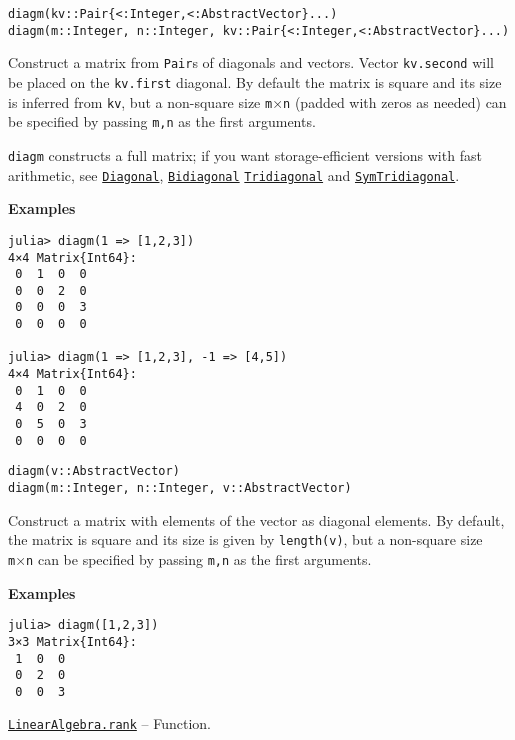 \begin{adjustwidth}{2em}{0pt}


\begin{verbatim}
diagm(kv::Pair{<:Integer,<:AbstractVector}...)
diagm(m::Integer, n::Integer, kv::Pair{<:Integer,<:AbstractVector}...)
\end{verbatim}

Construct a matrix from \texttt{Pair}s of diagonals and vectors. Vector \texttt{kv.second} will be placed on the \texttt{kv.first} diagonal. By default the matrix is square and its size is inferred from \texttt{kv}, but a non-square size \texttt{m}×\texttt{n} (padded with zeros as needed) can be specified by passing \texttt{m,n} as the first arguments.

\texttt{diagm} constructs a full matrix; if you want storage-efficient versions with fast arithmetic, see \hyperlink{3300114559258360989}{\texttt{Diagonal}}, \hyperlink{6156150905679680892}{\texttt{Bidiagonal}} \hyperlink{17820886359515748171}{\texttt{Tridiagonal}} and \hyperlink{6062797780727203318}{\texttt{SymTridiagonal}}.

\textbf{Examples}


\begin{verbatim}
julia> diagm(1 => [1,2,3])
4×4 Matrix{Int64}:
 0  1  0  0
 0  0  2  0
 0  0  0  3
 0  0  0  0

julia> diagm(1 => [1,2,3], -1 => [4,5])
4×4 Matrix{Int64}:
 0  1  0  0
 4  0  2  0
 0  5  0  3
 0  0  0  0
\end{verbatim}




\begin{lstlisting}
diagm(v::AbstractVector)
diagm(m::Integer, n::Integer, v::AbstractVector)
\end{lstlisting}

Construct a matrix with elements of the vector as diagonal elements. By default, the matrix is square and its size is given by \texttt{length(v)}, but a non-square size \texttt{m}×\texttt{n} can be specified by passing \texttt{m,n} as the first arguments.

\textbf{Examples}


\begin{verbatim}
julia> diagm([1,2,3])
3×3 Matrix{Int64}:
 1  0  0
 0  2  0
 0  0  3
\end{verbatim}



\end{adjustwidth}
\hypertarget{439390458422397873}{}
\hyperlink{439390458422397873}{\texttt{LinearAlgebra.rank}}  -- {Function.}

